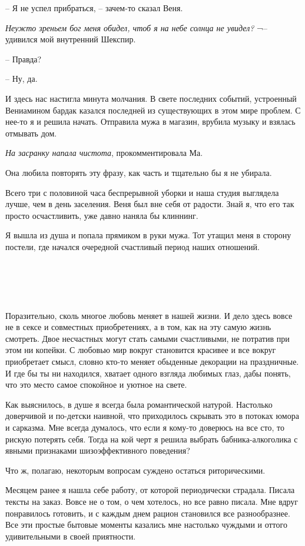 \documentclass[
]{book}
\begin{document}
-- Я не успел прибраться, -- зачем-то сказал Веня.

\emph{Неужто зреньем бог меня обидел, чтоб я на небе солнца не увидел?} ¬-- удивился мой внутренний Шекспир.

-- Правда?

-- Ну, да.

И здесь нас настигла минута молчания. В свете последних событий, устроенный Вениамином бардак казался последней из существующих в этом мире проблем. С нее-то я и решила начать. Отправила мужа в магазин, врубила музыку и взялась отмывать дом.

\emph{На засранку напала чистота}, прокомментировала Ма.

Она любила повторять эту фразу, как часть и тщательно бы я не убирала.

Всего три с половиной часа беспрерывной уборки и наша студия выглядела лучше, чем в день заселения. Веня был вне себя от радости. Знай я, что его так просто осчастливить, уже давно наняла бы клиннинг.

Я вышла из душа и попала прямиком в руки мужа. Тот утащил меня в сторону постели, где начался очередной счастливый период наших отношений.

\hypertarget{chapter-79}{%
\chapter{~}\label{chapter-79}}

Поразительно, сколь многое любовь меняет в нашей жизни. И дело здесь вовсе не в сексе и совместных приобретениях, а в том, как на эту самую жизнь смотреть. Двое несчастных могут стать самыми счастливыми, не потратив при этом ни копейки. С любовью мир вокруг становится красивее и все вокруг приобретает смысл, словно кто-то меняет обыденные декорации на праздничные. И где бы ты ни находился, хватает одного взгляда любимых глаз, дабы понять, что это место самое спокойное и уютное на свете.

Как выяснилось, в душе я всегда была романтической натурой. Настолько доверчивой и по-детски наивной, что приходилось скрывать это в потоках юмора и сарказма. Мне всегда думалось, что если я кому-то доверюсь на все сто, то рискую потерять себя. Тогда на кой черт я решила выбрать бабника-алкоголика с явными признаками шизоэффективного поведения?

Что ж, полагаю, некоторым вопросам суждено остаться риторическими.

Месяцем ранее я нашла себе работу, от которой периодически страдала. Писала тексты на заказ. Вовсе не о том, о чем хотелось, но все равно писала. Мне вдруг понравилось готовить, и с каждым днем рацион становился все разнообразнее. Все эти простые бытовые моменты казались мне настолько чуждыми и оттого удивительными в своей приятности.
\end{document}
